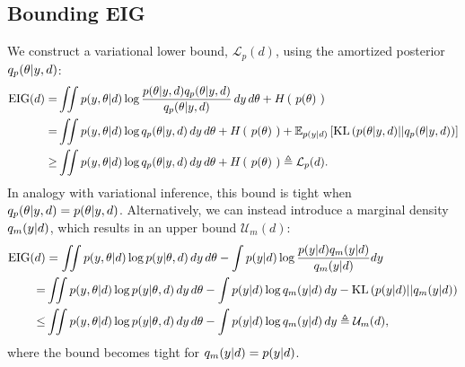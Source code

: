 \subsection{Bounding EIG}
\label{sec:bounds}
We construct a variational lower bound, $\mathcal{L}_p(d)$, using the amortized posterior $q_p(\theta | y,d)$:
\begin{align}
	\text{EIG}(d) =& \iint  p(y, \theta | d) \log \frac{p(\theta | y, d)q_{{p}}(\theta | y,d)}{q_p(\theta | y,d)} \, dy \, d\theta + H\left(\ p(\theta)\ \right)  \\
	\label{eq:postboundkl}
	=& \iint p(y, \theta | d) \log q_p(\theta | y, d)  \, dy\, d\theta+H\left(\ p(\theta)\ \right) + \mathbb{E}_{p(y|d)} \left[\text{KL}\left(p(\theta | y,d)||q_p(\theta | y, d)\right)\right]\\
	\label{eq:postbound}
	\ge& \iint p(y, \theta | d) \log q_p(\theta | y, d) \, dy\, d\theta+H\left(\ p(\theta)\ \right) \triangleq \mathcal{L}_p(d).
\end{align}
In analogy with variational inference, this bound is tight when $q_p(\theta | y, d) = p(\theta | y, d)$.
%
Alternatively, we can instead introduce a marginal density $q_m(y|d)$, which results in an upper bound $\mathcal{U}_m(d)$:
\begin{align}
	\text{EIG}(d)&= \iint p(y, \theta | d) \log p(y | \theta, d) \, dy\, d\theta-\int p(y|d) \log \frac{p(y|d)q_m(y|d)}{q_m(y|d)} dy
	\\
	=& \iint p(y, \theta | d) \log p(y | \theta, d) \, dy\, d\theta-\int p(y|d) \log q_m(y|d) \, dy
	-\text{KL}\left(p(y|d)||q_m(y|d)\right)\\
	\label{eq:margbound}
	\le& \iint p(y, \theta | d) \log p(y | \theta, d) \, dy\, d\theta-\int p(y|d) \log q_m(y|d) \, dy
	\triangleq \mathcal{U}_m(d),
\end{align}
where the bound becomes tight for $q_m(y|d)=p(y|d)$.

